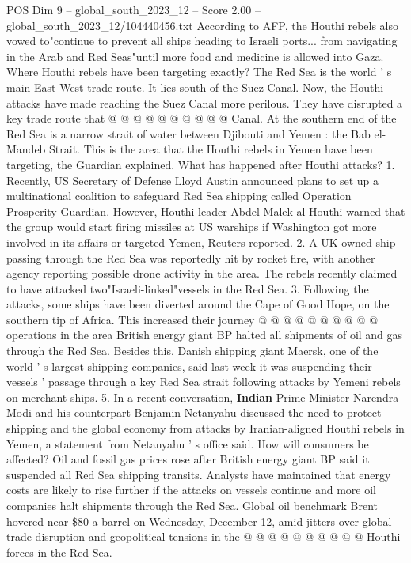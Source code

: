 \begin{textsample}{POS Dim 9 – global\_south\_2023\_12 – Score 2.00 – global\_south\_2023\_12/104440456.txt}
According to AFP, the Houthi rebels also vowed to"continue to prevent all ships heading to Israeli ports... from navigating in the Arab and Red Seas"until more food and medicine is allowed into Gaza.
Where Houthi rebels have been targeting exactly?
The Red Sea is the world ' s main East-West trade route.
It lies south of the Suez Canal.
Now, the Houthi attacks have made reaching the Suez Canal more perilous.
They have disrupted a key trade route that @ @ @ @ @ @ @ @ @ @ Canal.
At the southern end of the Red Sea is a narrow strait of water between Djibouti and Yemen : the Bab el-Mandeb Strait.
This is the area that the Houthi rebels in Yemen have been targeting, the Guardian explained.
What has happened after Houthi attacks? 1.
Recently, US Secretary of Defense Lloyd Austin announced plans to set up a multinational coalition to safeguard Red Sea shipping called Operation Prosperity Guardian.
However, Houthi leader Abdel-Malek al-Houthi warned that the group would start firing missiles at US warships if Washington got more involved in its affairs or targeted Yemen, Reuters reported. 2.
A UK-owned ship passing through the Red Sea was reportedly hit by rocket fire, with another agency reporting possible drone activity in the area.
The rebels recently claimed to have attacked two"Israeli-linked"vessels in the Red Sea. 3.
Following the attacks, some ships have been diverted around the Cape of Good Hope, on the southern tip of Africa.
This increased their journey @ @ @ @ @ @ @ @ @ @ operations in the area British energy giant BP halted all shipments of oil and gas through the Red Sea.
Besides this, Danish shipping giant Maersk, one of the world ' s largest shipping companies, said last week it was suspending their vessels ' passage through a key Red Sea strait following attacks by Yemeni rebels on merchant ships. 5.
In a recent conversation, \textbf{Indian} Prime Minister Narendra Modi and his counterpart Benjamin Netanyahu discussed the need to protect shipping and the global economy from attacks by Iranian-aligned Houthi rebels in Yemen, a statement from Netanyahu ' s office said.
How will consumers be affected?
Oil and fossil gas prices rose after British energy giant BP said it suspended all Red Sea shipping transits.
Analysts have maintained that energy costs are likely to rise further if the attacks on vessels continue and more oil companies halt shipments through the Red Sea.
Global oil benchmark Brent hovered near \$80 a barrel on Wednesday, December 12, amid jitters over global trade disruption and geopolitical tensions in the @ @ @ @ @ @ @ @ @ @ Houthi forces in the Red Sea.

\end{textsample}
